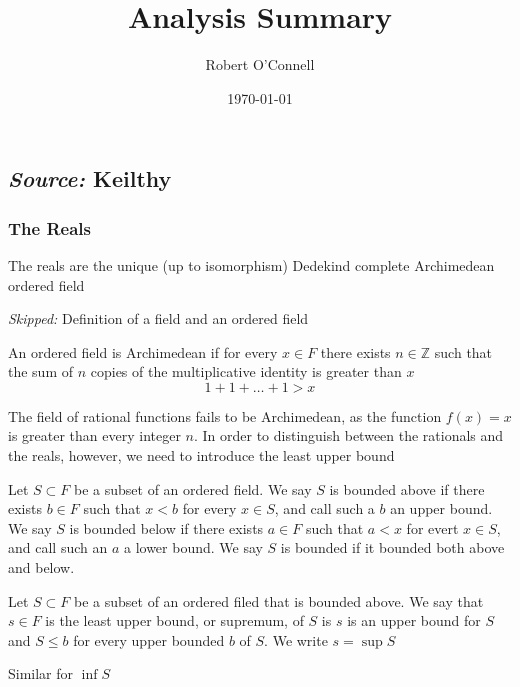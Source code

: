 \documentclass{article}
\title{\textbf{Analysis Summary}}
\author{Robert O'Connell}
\date{\today}
\begin{document}
\maketitle

\subsection*{\emph{Source:} Keilthy}
\subsubsection*{The Reals}
\begin{fact}
	The reals are the unique (up to isomorphism) Dedekind complete Archimedean
	ordered field
\end{fact}

\emph{Skipped:} Definition of a field and an ordered field

\begin{definition}
	An ordered field is Archimedean if for every \( x \in F\) there exists \( n \in \mathbb{Z} \) such that the sum of \( n \) copies of the multiplicative identity is greater than \( x \)
	\[
		1 + 1 + \ldots + 1 > x
	\]
\end{definition}

The field of rational functions fails to be Archimedean, as the function \( f(x) = x \) is greater than every integer \( n \). In order to distinguish between the rationals and the reals, however, we need to introduce the least upper bound

\begin{definition}
	Let \( S \subset F \) be a subset of an ordered field. We say \( S \) is bounded above if there exists \( b \in F \) such that \( x < b\) for every \(x \in S\), and call such a \( b \) an upper bound. We say \( S \) is bounded below if there exists \( a \in F \) such that \( a < x \) for evert \(  x \in S \), and call such an \( a \) a lower bound. We say \( S \) is bounded if it bounded both above and below.
\end{definition}

\begin{definition}
	Let \(  S \subset  F \) be a subset of an ordered filed that is bounded above. We say that \( s \in F \) is the least upper bound, or supremum, of \( S \) is \( s \) is an upper bound for \( S \) and \( S \le b \) for every upper  bounded \( b \) of \( S \). We write \( s = \sup{S} \)

	Similar for \( \inf{S} \)
\end{definition}
\end{document}
